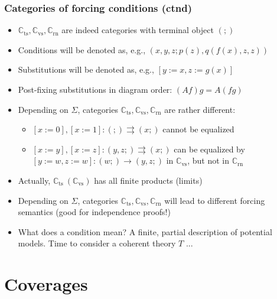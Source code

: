 \documentclass[handout,11pt]{beamer}
\newcommand*{\subvs}{_{\mathrm{vs}}}
\newcommand*{\subrn}{_{\mathrm{rn}}}
\newcommand*{\subts}{_{\mathrm{ts}}}
\newcommand{\Cvs}{\mathbb{C}\subvs}
\newcommand{\Crn}{\mathbb{C}\subrn}
\newcommand{\Cts}{\mathbb{C}\subts}
\begin{document}
\begin{frame}
\frametitle{Categories of forcing conditions (ctnd)}
 \begin{itemize}[<+->]   %
    \item $\Cts,\Cvs,\Crn$ are indeed categories with terminal object $(;)$
    \item Conditions will be denoted as, e.g., $(x,y,z;p(z),q(f(x),z,z))$
    \item Substitutions will be denoted as, e.g., $[y:=x,z:=g(x)]$
    \item Post-fixing substitutions in diagram order: $(Af)g = A(fg)$
    \item Depending on $\Sigma$, categories
    $\Cts,\Cvs,\Crn$ are rather different:
     \begin{itemize}
      \item $[x:=0],[x:=1]:(;)\rightrightarrows(x;)$ cannot be equalized
      \item $[x:=y],[x:=z]:(y,z;)\rightrightarrows(x;)$ can be equalized    
      by $[y:=w,z:=w]:(w;)\to(y,z;)$ in $\Cvs$, but not in $\Crn$
     \end{itemize}
    \item Actually, $\Cts~(\Cvs)$ has all finite products (limits) 
    \item Depending on $\Sigma$, categories $\Cts,\Cvs,\Crn$ will 
    lead to different forcing semantics 
    (good for independence proofs!)
    \item What does a condition mean? A finite, partial description
    of potential models. Time to consider a coherent theory $T$ ...       
 \end{itemize}
\end{frame}

\section{Coverages}
\end{document}
